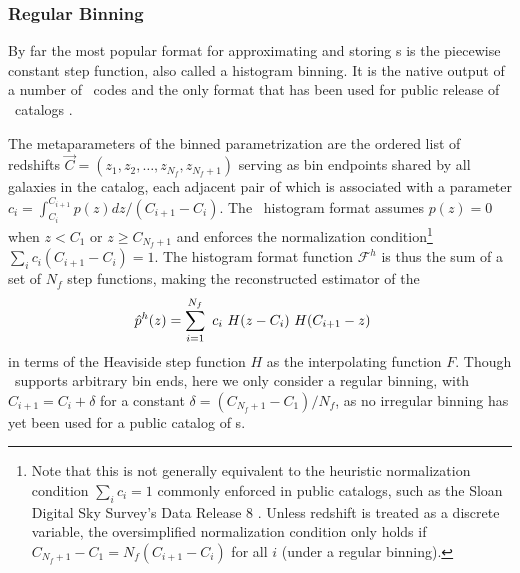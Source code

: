 
\subsubsection{Regular Binning}

By far the most popular format for approximating and storing \pz s is the 
piecewise constant step function, also called a histogram binning.
It is the native output of a number of \pz\ codes 
\citep{carrasco_kind_somz:_2014, sadeh_annz2:_2016, cavuoti_metaphor:_2017} and 
the only format that has been used for public release of \pz\ catalogs 
\citep{sheldon_photometric_2012, tanaka_photometric_2017, de_jong_third_2017}.

The metaparameters of the binned parametrization are the ordered list of 
redshifts $\vec{C} = (z_{1}, z_{2}, \dots, z_{N_{f}}, z_{N_{f}+1})$ serving as 
bin endpoints shared by all galaxies in the catalog, each adjacent pair of 
which is associated with a parameter $c_{i} = \int_{C_{i}}^{C_{i+1}} p(z) dz / 
(C_{i+1} - C_{i})$.
The \qp\ histogram format assumes $p(z)=0$ when $z<C_{1}$ or $z\geq 
C_{N_{f}+1}$ and enforces the normalization condition\footnote{
	Note that this is not generally equivalent to the heuristic normalization 
	condition $\sum_{i} c_{i} = 1$ commonly enforced in public catalogs, such as 
	the Sloan Digital Sky Survey's Data Release 8 \citep{sheldon_photometric_2012}.
	Unless redshift is treated as a discrete variable, the oversimplified 
	normalization condition only holds if $C_{N_{f}+1} - C_{1} = N_{f} (C_{i+1} - 
	C_{i})$ for all $i$ (under a regular binning).
}
$\sum_{i} c_{i} (C_{i+1} - C_{i}) = 1$.
The histogram format function $\mathcal{F}^{h}$ is thus the sum of a set of 
$N_{f}$ step functions, making the reconstructed estimator of the \pz
\begin{align}
\eqlabel{eq:binned}
\hat{p}^{h}(z) &= \sum_{i=1}^{N_{f}}\ c_{i}\ H(z - C_{i})\ H(C_{i+1} - z)
\end{align}
in terms of the Heaviside step function $H$ as the interpolating function $F$.
Though \qp\ supports arbitrary bin ends, here we only consider a regular 
binning, with $C_{i+1} = C_{i} + \delta$ for a constant $\delta = (C_{N_{f}+1} 
- C_{1}) / N_{f}$, as no irregular binning has yet been used for a public 
catalog of \pz s.

